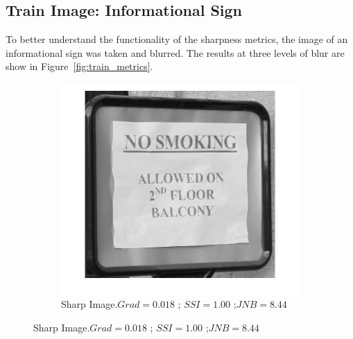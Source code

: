 \subsection{Train Image: Informational Sign}
To better understand the functionality of the sharpness metrics, the image of an informational sign was taken and blurred. The results at three levels of blur are show in Figure~\ref{fig:train_metrics}.

\begin{figure}[H]
        \centering
        \begin{subfigure}[b]{0.3\textwidth}
                \centering
                \includegraphics[width=\textwidth]{true.jpg}
                \caption{\fontsize{10}{1} \selectfont Sharp Image.\newline $Grad=0.018$ ; $SSI=1.00$ ;\newline $JNB=8.44$}
               

\end{subfigure}
\end{figure}

